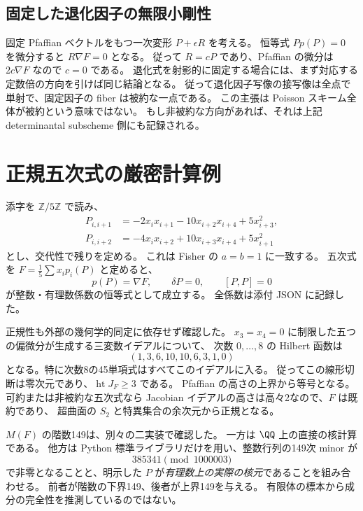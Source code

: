 \subsection{固定した退化因子の無限小剛性}

固定 Pfaffian ベクトルをもつ一次変形 $P+\epsilon R$ を考える。
恒等式 $Pp(P)=0$ を微分すると $R\nabla F=0$ となる。
従って $R=cP$ であり、Pfaffian の微分は $2c\nabla F$ なので $c=0$ である。
退化式を射影的に固定する場合には、まず対応する定数倍の方向を引けば同じ結論となる。
従って退化因子写像の接写像は全点で単射で、固定因子の fiber は被約な一点である。
この主張は Poisson スキーム全体が被約という意味ではない。
もし非被約な方向があれば、それは上記 determinantal subscheme 側にも記録される。

\section{正規五次式の厳密計算例}
\label{sec:witness}

添字を $\mathbb Z/5\mathbb Z$ で読み、
\begin{align*}
 P_{i,i+1}&=-2x_ix_{i+1}-10x_{i+2}x_{i+4}+5x_{i+3}^2,\\
 P_{i,i+2}&=-4x_ix_{i+2}+10x_{i+3}x_{i+4}+5x_{i+1}^2
\end{align*}
とし、交代性で残りを定める。
これは Fisher \cite[(38)--(39)]{Fisher} の $a=b=1$ に一致する。
五次式を $F=\frac15\sum x_i p_i(P)$ と定めると、
\[
         p(P)=\nabla F,\qquad \delta P=0,\qquad [P,P]=0
\]
が整数・有理数係数の恒等式として成立する。
全係数は添付 JSON に記録した。

正規性も外部の幾何学的同定に依存せず確認した。
$x_3=x_4=0$ に制限した五つの偏微分が生成する三変数イデアルについて、
次数 $0,\ldots,8$ の Hilbert 函数は
\[
                 (1,3,6,10,10,6,3,1,0)
\]
となる。特に次数8の45単項式はすべてこのイデアルに入る。
従ってこの線形切断は零次元であり、$\operatorname{ht}J_F\ge3$ である。
Pfaffian の高さの上界から等号となる。
可約または非被約な五次式なら Jacobian イデアルの高さは高々2なので、$F$ は既約であり、
超曲面の $S_2$ と特異集合の余次元から正規となる。

$M(F)$ の階数149は、別々の二実装で確認した。
一方は $\QQ$ 上の直接の核計算である。
他方は Python 標準ライブラリだけを用い、整数行列の149次 minor が
\[
                      385341\pmod {1000003}
\]
で非零となることと、明示した $P$ が\emph{有理数上の実際の核元}であることを組み合わせる。
前者が階数の下界149、後者が上界149を与える。
有限体の標本から成分の完全性を推測しているのではない。


